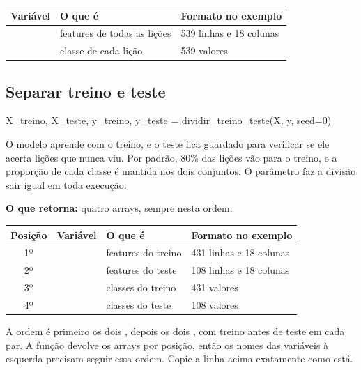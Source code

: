 \documentclass[11pt,a4paper]{article}
\newcommand{\code}[1]{\texttt{\detokenize{#1}}}
\newenvironment{tabela}{\par\nopagebreak[4]\vspace{0.3em}\nopagebreak[4]\begingroup\centering\small}{\par\endgroup\vspace{0.6em}}
\begin{document}
\begin{tabela}
\begin{tabular}{lll}
\toprule
Variável & O que é & Formato no exemplo\\
\midrule
\code{X} & features de todas as lições & 539 linhas e 18 colunas\\
\code{y} & classe de cada lição & 539 valores\\
\bottomrule
\end{tabular}
\end{tabela}

\subsection{Separar treino e teste}

\begin{py}
X_treino, X_teste, y_treino, y_teste = dividir_treino_teste(X, y, seed=0)
\end{py}

O modelo aprende com o treino, e o teste fica guardado para verificar se ele acerta lições que nunca viu. Por padrão, 80\% das lições vão para o treino, e a proporção de cada classe é mantida nos dois conjuntos. O parâmetro \code{seed} faz a divisão sair igual em toda execução.

\textbf{O que retorna:} quatro arrays, sempre nesta ordem.

\begin{tabela}
\begin{tabular}{clll}
\toprule
Posição & Variável & O que é & Formato no exemplo\\
\midrule
1º & \code{X_treino} & features do treino & 431 linhas e 18 colunas\\
2º & \code{X_teste} & features do teste & 108 linhas e 18 colunas\\
3º & \code{y_treino} & classes do treino & 431 valores\\
4º & \code{y_teste} & classes do teste & 108 valores\\
\bottomrule
\end{tabular}
\end{tabela}

\begin{nota}
A ordem é primeiro os dois \code{X}, depois os dois \code{y}, com treino antes de teste em cada par. A função devolve os arrays por posição, então os nomes das variáveis à esquerda precisam seguir essa ordem. Copie a linha acima exatamente como está.
\end{nota}
\end{document}
